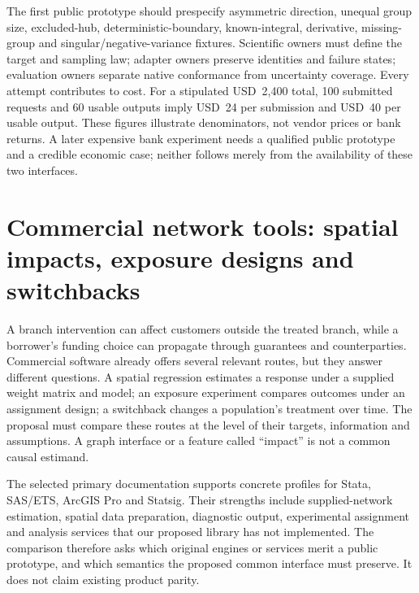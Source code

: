 The first public prototype should prespecify asymmetric direction, unequal
group size, excluded-hub, deterministic-boundary, known-integral, derivative,
missing-group and singular/negative-variance fixtures. Scientific owners must
define the target and sampling law; adapter owners preserve identities and
failure states; evaluation owners separate native conformance from uncertainty
coverage. Every attempt contributes to cost. For a stipulated USD~2,400 total,
100 submitted requests and 60 usable outputs imply USD~24 per submission and
USD~40 per usable output. These figures illustrate denominators, not vendor
prices or bank returns. A later expensive bank experiment needs a qualified
public prototype and a credible economic case; neither follows merely from
the availability of these two interfaces.
\citep{exec24_interference_reference}


\section{Commercial network tools: spatial impacts, exposure designs and switchbacks}
\label{exec20:network-scope}

A branch intervention can affect customers outside the treated branch, while a
borrower's funding choice can propagate through guarantees and counterparties.
Commercial software already offers several relevant routes, but they answer
different questions. A spatial regression estimates a response under a supplied
weight matrix and model; an exposure experiment compares outcomes under an
assignment design; a switchback changes a population's treatment over time.
The proposal must compare these routes at the level of their targets, information
and assumptions. A graph interface or a feature called ``impact'' is not a
common causal estimand.

The selected primary documentation supports concrete profiles for Stata,
SAS/ETS, ArcGIS Pro and Statsig. Their strengths include supplied-network
estimation, spatial data preparation, diagnostic output, experimental assignment
and analysis services that our proposed library has not implemented. The
comparison therefore asks which original engines or services merit a public
prototype, and which semantics the proposed common interface must preserve.
It does not claim existing product parity.
\citep{exec20_network_stata_spregress,exec20_network_sas_latest_spatial,
exec20_network_arcgis_tool,exec20_network_statsig_types}

